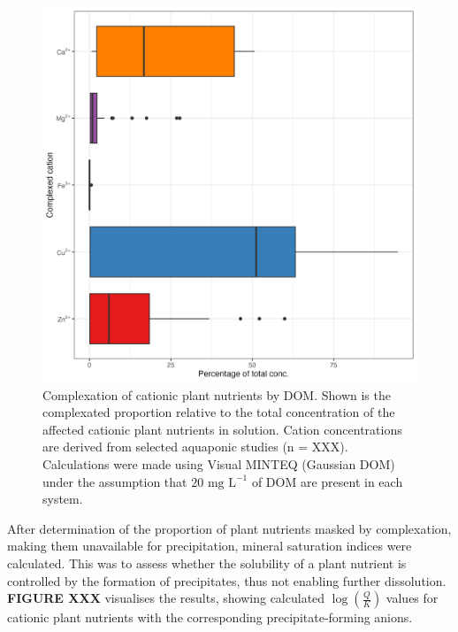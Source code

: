\documentclass[
]{article}
\begin{document}
\begin{figure}
\centering
\includegraphics{plots/boxplot_species_dom_vm.png}
\caption{Complexation of cationic plant nutrients by DOM. Shown is the complexated proportion relative to the total concentration of the affected cationic plant nutrients in solution. Cation concentrations are derived from selected aquaponic studies (n = XXX). Calculations were made using Visual MINTEQ (Gaussian DOM) under the assumption that \(20 \text{ mg L}^{-1}\) of DOM are present in each system.}
\end{figure}

After determination of the proportion of plant nutrients masked by complexation, making them unavailable for precipitation, mineral saturation indices were calculated. This was to assess whether the solubility of a plant nutrient is controlled by the formation of precipitates, thus not enabling further dissolution. \textbf{FIGURE XXX} visualises the results, showing calculated \(\log(\frac{Q}{K})\) values for cationic plant nutrients with the corresponding precipitate-forming anions.
\end{document}
